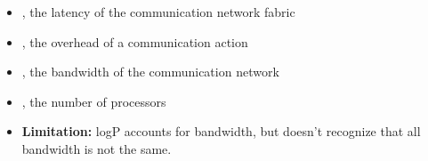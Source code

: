 \documentclass[../main.tex]{subfiles}
\begin{document}
\begin{itemize}
	\item {}, the latency of the communication network fabric
	\item {}, the overhead of a communication action
	\item {}, the bandwidth of the communication network
	\item {}, the number of processors
	\item \textbf{Limitation:} logP accounts for bandwidth, but doesn’t recognize that all bandwidth is not the same.
\end{itemize}
\end{document}
